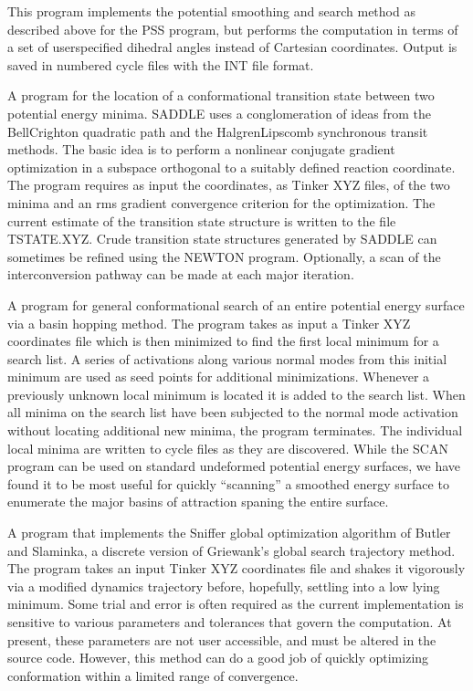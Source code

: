 \documentclass[letterpaper,11pt,english]{sphinxmanual}
\begin{document}

This program implements the potential smoothing and search method as described above for the PSS program, but performs the computation in terms of a set of user\sphinxhyphen{}specified dihedral angles instead of Cartesian coordinates. Output is saved in numbered cycle files with the INT file format.


A program for the location of a conformational transition state between two potential energy minima. SADDLE uses a conglomeration of ideas from the Bell\sphinxhyphen{}Crighton quadratic path and the Halgren\sphinxhyphen{}Lipscomb synchronous transit methods. The basic idea is to perform a nonlinear conjugate gradient optimization in a subspace orthogonal to a suitably defined reaction coordinate. The program requires as input the coordinates, as Tinker XYZ files, of the two minima and an rms gradient convergence criterion for the optimization. The current estimate of the transition state structure is written to the file TSTATE.XYZ. Crude transition state structures generated by SADDLE can sometimes be refined using the NEWTON program. Optionally, a scan of the interconversion pathway can be made at each major iteration.


A program for general conformational search of an entire potential energy surface via a basin hopping method. The program takes as input a Tinker XYZ coordinates file which is then minimized to find the first local minimum for a search list. A series of activations along various normal modes from this initial minimum are used as seed points for additional minimizations. Whenever a previously unknown local minimum is located it is added to the search list. When all minima on the search list have been subjected to the normal mode activation without locating additional new minima, the program terminates. The individual local minima are written to cycle files as they are discovered. While the SCAN program can be used on standard undeformed potential energy surfaces, we have found it to be most useful for quickly “scanning” a smoothed energy surface to enumerate the major basins of attraction spaning the entire surface.


A program that implements the Sniffer global optimization algorithm of Butler and Slaminka, a discrete version of Griewank’s global search trajectory method. The program takes an input Tinker XYZ coordinates file and shakes it vigorously via a modified dynamics trajectory before, hopefully, settling into a low lying minimum. Some trial and error is often required as the current implementation is sensitive to various parameters and tolerances that govern the computation. At present, these parameters are not user accessible, and must be altered in the source code. However, this method can do a good job of quickly optimizing conformation within a limited range of convergence.
\end{document}
